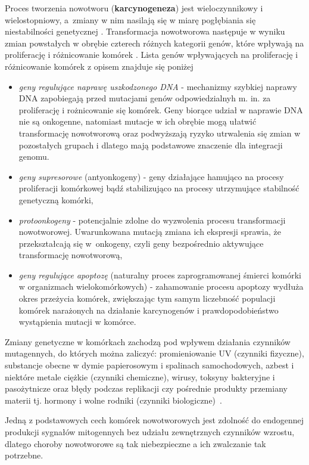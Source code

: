Proces tworzenia nowotworu (\textbf{karcynogeneza}) jest wieloczynnikowy i wielostopniowy, a~zmiany w nim nasilają się w miarę pogłębiania się niestabilności genetycznej \cite{zikula2}. Transformacja nowotworowa następuje w wyniku zmian powstałych w obrębie czterech różnych kategorii genów, które wpływają na proliferację i różnicowanie komórek \cite{zikula}. Lista genów wpływających na proliferację i różnicowanie komórek z opisem \cite{zikula4} znajduje się poniżej
\begin{itemize}
\item \textit{geny regulujące naprawę uszkodzonego DNA} - mechanizmy szybkiej naprawy DNA zapobiegają przed mutacjami genów odpowiedzialnyh m. in. za proliferację i rożnicowanie się komórek. Geny biorące udział w naprawie DNA nie są onkogenne, natomiast mutacje w ich obrębie mogą ułatwić transformację nowotworową oraz podwyższają ryzyko utrwalenia się zmian w pozostałych grupach i dlatego mają podstawowe znaczenie dla integracji genomu.
\item \textit{geny supresorowe} (antyonkogeny) - geny działające hamująco na procesy proliferacji komórkowej bądź stabilizująco na procesy utrzymujące stabilność genetyczną komórki,
\item \textit{protoonkogeny} - potencjalnie zdolne do wyzwolenia procesu transformacji nowotworowej. Uwarunkowana mutacją zmiana ich ekspresji sprawia, że przekształcają się w~onkogeny, czyli geny bezpośrednio aktywujące transformację nowotworową,
\item \textit{geny regulujące apoptozę} (naturalny proces zaprogramowanej śmierci komórki w organizmach wielokomórkowych) - zahamowanie procesu apoptozy wydłuża okres przeżycia komórek, zwiększając tym samym liczebność populacji komórek narażonych na działanie karcynogenów i prawdopodobieństwo wystąpienia mutacji w komórce.
\end{itemize}
Zmiany genetyczne w komórkach zachodzą pod wpływem działania czynników mutagennych, do których można zaliczyć: promieniowanie UV (czynniki fizyczne), substancje obecne w dymie papierosowym i spalinach samochodowych, azbest i niektóre metale ciężkie (czynniki chemiczne), wirusy, toksyny bakteryjne i pasożytnicze oraz błędy podczas replikacji czy pośrednie produkty przemiany materii tj. hormony i wolne rodniki (czynniki biologiczne)~\cite{zikula3}.

Jedną z podstawowych cech komórek nowotworowych jest zdolność do endogennej produkcji sygnałów mitogennych bez udziału zewnętrznych czynników wzrostu, dlatego choroby nowotworowe są tak niebezpieczne a ich zwalczanie tak potrzebne.


